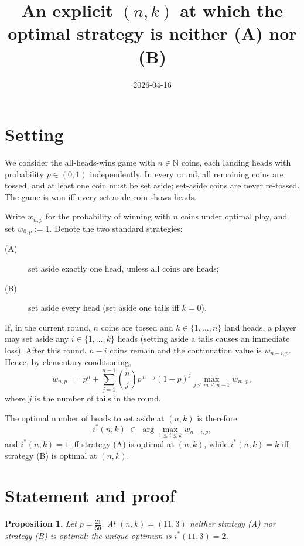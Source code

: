 \documentclass{article}
\title{An explicit $(n,k)$ at which the optimal strategy is neither (A) nor (B)}
\author{}
\date{2026-04-16}
\newtheorem{proposition}{Proposition}
\theoremstyle{remark}
\begin{document}
\maketitle

\section*{Setting}

We consider the all-heads-wins game with $n\in\mathbb N$ coins, each landing
heads with probability $p\in(0,1)$ independently. In every round, all
remaining coins are tossed, and at least one coin must be set aside;
set-aside coins are never re-tossed. The game is won iff every set-aside
coin shows heads.

Write $w_{n,p}$ for the probability of winning with $n$ coins under
optimal play, and set $w_{0,p}:=1$. Denote the two standard strategies:
\begin{description}
  \item[(A)] set aside exactly one head, unless all coins are heads;
  \item[(B)] set aside every head (set aside one tails iff $k=0$).
\end{description}
If, in the current round, $n$ coins are tossed and $k\in\{1,\dots,n\}$ land
heads, a player may set aside any $i\in\{1,\dots,k\}$ heads (setting aside
a tails causes an immediate loss). After this round, $n-i$ coins remain and
the continuation value is $w_{n-i,p}$. Hence, by elementary conditioning,
\begin{equation}\label{eq:bellman}
  w_{n,p} \;=\; p^n + \sum_{j=1}^{n-1} \binom{n}{j} p^{\,n-j} (1-p)^j
  \max_{j\le m\le n-1} w_{m,p},
\end{equation}
where $j$ is the number of tails in the round.

The optimal number of heads to set aside at $(n,k)$ is therefore
\begin{equation}\label{eq:policy}
  i^{*}(n,k)\;\in\;\arg\max_{1\le i\le k} w_{n-i,p},
\end{equation}
and $i^{*}(n,k)=1$ iff strategy (A) is optimal at $(n,k)$, while
$i^{*}(n,k)=k$ iff strategy (B) is optimal at $(n,k)$.

\section*{Statement and proof}

\begin{proposition}
  Let $p=\tfrac{21}{50}$. At $(n,k)=(11,3)$ neither strategy {\rm (A)} nor
  strategy {\rm (B)} is optimal; the unique optimum is $i^{*}(11,3)=2$.
\end{proposition}
\end{document}
